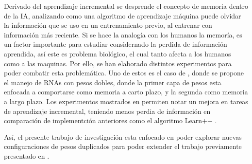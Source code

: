     Derivado del aprendizaje incremental se desprende el concepto de memoria dentro de la IA, analizando 
    como una algoritmo de aprendizaje máquina puede olvidar la información que se uso en un entrenamiento 
    previo, al entrenar con información más reciente. Si se hace la analogía con los humanos la memoría, 
    es un factor importante para estudiar considernado la perdida de información aprendida, así este es 
    problema biol\'ogico, el cual tanto afecta a los humanos como a las maquinas. Por ello, se han 
    elaborado distintos experimentos para poder combatir esta problemática.  Uno de estos es el 
    caso de \cite{bullinaria2009},  donde se propone el manejo de RNAs con pesos dobles,  donde la 
    primer capa de pesos esta enfocada a comportarse como memoria a carto plazo, y la segunda como memoria 
    a largo plazo.  Los experimentos mostrados en \cite{bullinaria2009} permiten notar un mejora en tareas 
    de aprendizaje incremental, teniendo menos perdia de información en comparación de implementción 
    anteriores como el algoritmo  Learn++ \cite{li2008, Elwell2011}.

    Así, el presente trabajo de investigación esta enfocado en poder explorar nuevas configuraciones 
    de pesos duplicados para poder extender el trabajo previamente presentado en \cite{bullinaria2009}.







